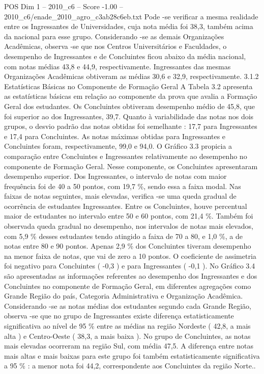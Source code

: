 \begin{textsample}{POS Dim 1 – 2010\_c6 – Score -1.00 – 2010\_c6/enade\_2010\_agro\_c3ab28c6eb.txt}
Pode -se verificar a mesma realidade entre os Ingressantes de Universidades, cuja nota média foi 38,3, também acima da nacional para esse grupo.
Considerando -se as demais Organizações Acadêmicas, observa -se que nos Centros Universitários e Faculdades, o desempenho de Ingressantes e de Concluintes ficou abaixo da média nacional, com notas médias 43,8 e 44,9, respectivamente.
Ingressantes das mesmas Organizações Acadêmicas obtiveram as médias 30,6 e 32,9, respectivamente. 3.1.2 Estatísticas Básicas no Componente de Formação Geral A Tabela 3.2 apresenta as estatísticas básicas em relação ao componente da prova que avalia a Formação Geral dos estudantes.
Os Concluintes obtiveram desempenho médio de 45,8, que foi superior ao dos Ingressantes, 39,7.
Quanto à variabilidade das notas nos dois grupos, o desvio padrão das notas obtidas foi semelhante : 17,7 para Ingressantes e 17,4 para Concluintes.
As notas máximas obtidas para Ingressantes e Concluintes foram, respectivamente, 99,0 e 94,0.
O Gráfico 3.3 propicia a comparação entre Concluintes e Ingressantes relativamente ao desempenho no componente de Formação Geral.
Nesse componente, os Concluintes apresentaram desempenho superior.
Dos Ingressantes, o intervalo de notas com maior frequência foi de 40 a 50 pontos, com 19,7 \%, sendo essa a faixa modal.
Nas faixas de notas seguintes, mais elevadas, verifica -se uma queda gradual de ocorrência de estudantes Ingressantes.
Entre os Concluintes, houve percentual maior de estudantes no intervalo entre 50 e 60 pontos, com 21,4 \%.
Também foi observada queda gradual no desempenho, nos intervalos de notas mais elevados, com 5,9 \% desses estudantes tendo atingido a faixa de 70 a 80, e 1,0 \%, a de notas entre 80 e 90 pontos.
Apenas 2,9 \% dos Concluintes tiveram desempenho na menor faixa de notas, que vai de zero a 10 pontos.
O coeficiente de assimetria foi negativo para Concluintes ( -0,3 ) e para Ingressantes ( -0,1 ).
No Gráfico 3.4 são apresentadas as informações referentes ao desempenho dos Ingressantes e dos Concluintes no componente de Formação Geral, em diferentes agregações como Grande Região do país, Categoria Administrativa e Organização Acadêmica.
Considerando -se as notas médias dos estudantes segundo cada Grande Região, observa -se que no grupo de Ingressantes existe diferença estatisticamente significativa ao nível de 95 \% entre as médias na região Nordeste ( 42,8, a mais alta ) e Centro-Oeste ( 38,3, a mais baixa ).
No grupo de Concluintes, as notas mais elevadas ocorreram na região Sul, com média 47,5.
A diferença entre notas mais altas e mais baixas para este grupo foi também estatisticamente significativa a 95 \% : a menor nota foi 44,2, correspondente aos Concluintes da região Norte..

\end{textsample}
